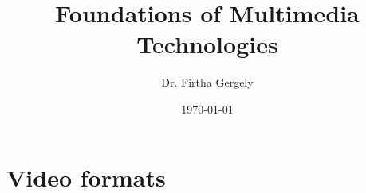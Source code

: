 \documentclass{book}
\title{Foundations of Multimedia Technologies}
\author{Dr. Firtha Gergely}
\date{\today}
\begin{document}
\sloppy 


\titlepage
\maketitle
\cleardoublepage 
  
\tableofcontents

\setcounter{page}{1}			%


% 

\chapter{Video formats}
\label{sec:video_formats}
 
\end{document}
